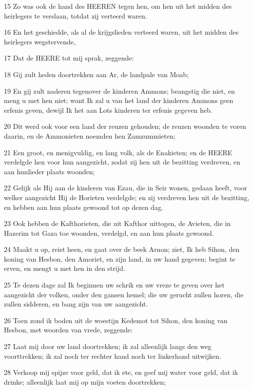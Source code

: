\par 15 Zo was ook de hand des HEEREN tegen hen, om hen uit het midden des heirlegers te verslaan, totdat zij verteerd waren.
\par 16 En het geschiedde, als al de krijgslieden verteerd waren, uit het midden des heirlegers wegstervende,
\par 17 Dat de HEERE tot mij sprak, zeggende:
\par 18 Gij zult heden doortrekken aan Ar, de landpale van Moab;
\par 19 En gij zult naderen tegenover de kinderen Ammons; beangstig die niet, en meng u met hen niet; want Ik zal u van het land der kinderen Ammons geen erfenis geven, dewijl Ik het aan Lots kinderen ter erfenis gegeven heb.
\par 20 Dit werd ook voor een land der reuzen gehouden; de reuzen woonden te voren daarin, en de Ammonieten noemden hen Zamzummieten;
\par 21 Een groot, en menigvuldig, en lang volk, als de Enakieten; en de HEERE verdelgde hen voor hun aangezicht, zodat zij hen uit de bezitting verdreven, en aan hunlieder plaats woonden;
\par 22 Gelijk als Hij aan de kinderen van Ezau, die in Seir wonen, gedaan heeft, voor welker aangezicht Hij de Horieten verdelgde; en zij verdreven hen uit de bezitting, en hebben aan hun plaats gewoond tot op dezen dag.
\par 23 Ook hebben de Kafthorieten, die uit Kafthor uittogen, de Avieten, die in Hazerim tot Gaza toe woonden, verdelgd, en aan hun plaats gewoond.
\par 24 Maakt u op, reist heen, en gaat over de beek Arnon; ziet, Ik heb Sihon, den koning van Hesbon, den Amoriet, en zijn land, in uw hand gegeven; begint te erven, en mengt u met hen in den strijd.
\par 25 Te dezen dage zal Ik beginnen uw schrik en uw vreze te geven over het aangezicht der volken, onder den gansen hemel; die uw gerucht zullen horen, die zullen sidderen, en bang zijn van uw aangezicht.
\par 26 Toen zond ik boden uit de woestijn Kedemot tot Sihon, den koning van Hesbon, met woorden van vrede, zeggende:
\par 27 Laat mij door uw land doortrekken; ik zal alleenlijk langs den weg voorttrekken; ik zal noch ter rechter hand noch ter linkerhand uitwijken.
\par 28 Verkoop mij spijze voor geld, dat ik ete, en geef mij water voor geld, dat ik drinke; alleenlijk laat mij op mijn voeten doortrekken;
